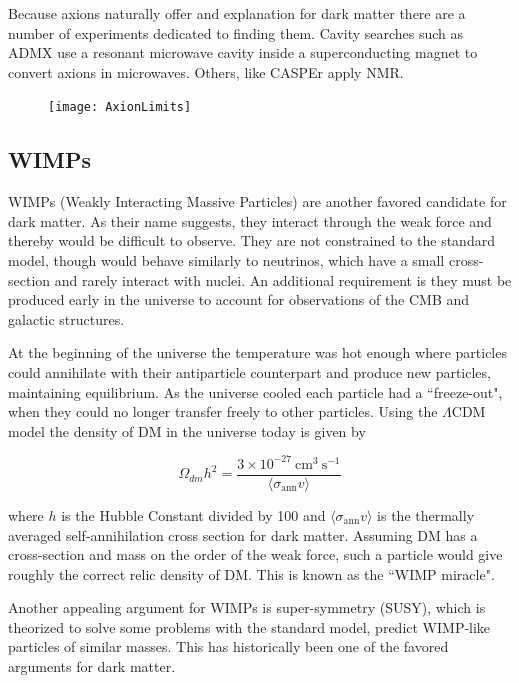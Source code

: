 Because axions naturally offer and explanation for dark matter there are a number of experiments dedicated to
finding them.  Cavity searches such as ADMX use a resonant microwave cavity inside a superconducting magnet
to convert axions in microwaves.  Others, like CASPEr apply NMR.

\begin{figure}
\centering
\texttt{[image: AxionLimits]}
\label{fig:axions}
\end{figure}


\subsection{WIMPs} \label{subsec:wimps}
WIMPs (Weakly Interacting Massive Particles) are another favored candidate for dark matter.  As their name
suggests, they interact through the weak force and thereby would be difficult to observe.  They
are not constrained to the standard model, though would behave similarly
to neutrinos, which have a small cross-section and rarely interact with nuclei.  An additional requirement
is they must be produced early in the universe to account for observations of the CMB and galactic
structures.

At the beginning of the universe the temperature was hot enough where particles could annihilate with their
antiparticle counterpart and produce new particles, maintaining equilibrium.  As the universe cooled each
particle had a ``freeze-out", when they could no longer transfer freely to other particles.  Using the
$\Lambda$CDM model the density of DM in the universe today is given by

\begin{equation}
\Omega_{dm}h^{2} = \frac{3 \times 10^{-27}\ \mathrm{cm^{3}\ s^{-1}}}{\langle \sigma_{\mathrm{ann}} v \rangle}
\end{equation}

\noindent where $h$ is the Hubble Constant divided by 100 and $\langle \sigma_{\mathrm{ann}} v \rangle$ is
the thermally averaged self-annihilation cross section
for dark matter.  Assuming DM has a cross-section and mass on the order of the weak force, such a
particle would give roughly the correct relic density of DM.  This is known as the ``WIMP miracle".

Another appealing argument for WIMPs is super-symmetry (SUSY), which is theorized to solve some problems
with the standard model,
predict WIMP-like particles of similar masses.  This has historically been one of the favored arguments
for dark matter.

